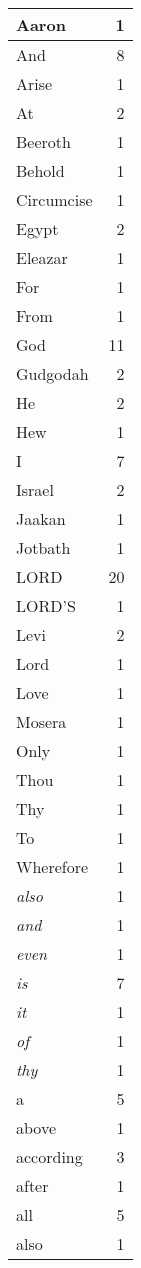 \begin{center}
\begin{longtable}{l|r}
\hline \hline
\endlastfoot
Aaron & 1 \\ \hline
And & 8 \\ \hline
Arise & 1 \\ \hline
At & 2 \\ \hline
Beeroth & 1 \\ \hline
Behold & 1 \\ \hline
Circumcise & 1 \\ \hline
Egypt & 2 \\ \hline
Eleazar & 1 \\ \hline
For & 1 \\ \hline
From & 1 \\ \hline
God & 11 \\ \hline
Gudgodah & 2 \\ \hline
He & 2 \\ \hline
Hew & 1 \\ \hline
I & 7 \\ \hline
Israel & 2 \\ \hline
Jaakan & 1 \\ \hline
Jotbath & 1 \\ \hline
LORD & 20 \\ \hline
LORD'S & 1 \\ \hline
Levi & 2 \\ \hline
Lord & 1 \\ \hline
Love & 1 \\ \hline
Mosera & 1 \\ \hline
Only & 1 \\ \hline
Thou & 1 \\ \hline
Thy & 1 \\ \hline
To & 1 \\ \hline
Wherefore & 1 \\ \hline
\emph{also} & 1 \\ \hline
\emph{and} & 1 \\ \hline
\emph{even} & 1 \\ \hline
\emph{is} & 7 \\ \hline
\emph{it} & 1 \\ \hline
\emph{of} & 1 \\ \hline
\emph{thy} & 1 \\ \hline
a & 5 \\ \hline
above & 1 \\ \hline
according & 3 \\ \hline
after & 1 \\ \hline
all & 5 \\ \hline
also & 1 \\ \hline

\end{longtable}
\end{center}
